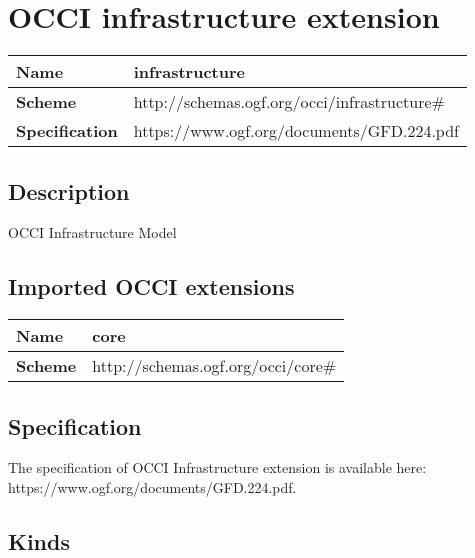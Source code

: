 \section{OCCI infrastructure extension}
\begin{center}
\begin{tabular}{|l|l|}
  \hline
  \textbf{Name} & infrastructure \\
  \hline  
  \textbf{Scheme} & http://schemas.ogf.org/occi/infrastructure\# \\
  \hline
  \textbf{Specification} & https://www.ogf.org/documents/GFD.224.pdf \\
  \hline
\end{tabular}
\end{center}

\subsection{Description}
OCCI Infrastructure Model
\subsection{Imported OCCI extensions}

\begin{center} 
\begin{tabular}{|l|l|}
  \hline
  \textbf{Name} & core \\
  \hline  
  \textbf{Scheme} & http://schemas.ogf.org/occi/core\# \\
  \hline
\end{tabular}
\end{center}


\subsection{Specification}
The specification of OCCI Infrastructure extension is available here: https://www.ogf.org/documents/GFD.224.pdf.
\subsection{Kinds}

